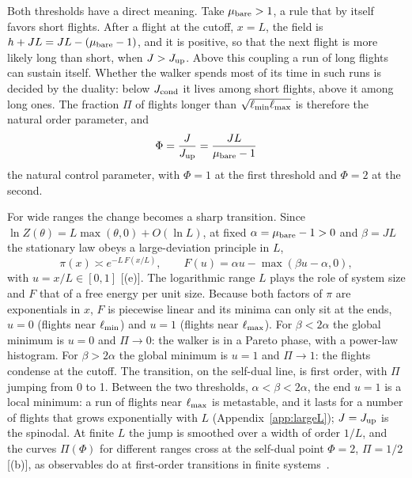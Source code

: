 Both thresholds have a direct meaning. Take $\mu_{\rm bare}>1$, a rule that by itself favors short flights. After a flight at the cutoff, $x=L$, the field is $h+JL=JL-(\mu_{\rm bare}-1)$, and it is positive, so that the next flight is more likely long than short, when $J>J_{\rm up}$. Above this coupling a run of long flights can sustain itself. Whether the walker spends most of its time in such runs is decided by the duality: below $J_{\rm cond}$ it lives among short flights, above it among long ones. The fraction $\Pi$ of flights longer than $\sqrt{\ell_{\min}\ell_{\max}}$ is therefore the natural order parameter, and
\begin{equation}
\Phi=\frac J{J_{\rm up}}=\frac{JL}{\mu_{\rm bare}-1}
\end{equation}
the natural control parameter, with $\Phi=1$ at the first threshold and $\Phi=2$ at the second.

For wide ranges the change becomes a sharp transition. Since $\ln Z(\theta)=L\max(\theta,0)+O(\ln L)$, at fixed $\alpha=\mu_{\rm bare}-1>0$ and $\beta=JL$ the stationary law obeys a large-deviation principle in $L$,
\begin{equation}
\pi(x)\asymp e^{-L\,F(x/L)},\qquad F(u)=\alpha u-\max(\beta u-\alpha,0),
\label{eq:freeenergy}
\end{equation}
with $u=x/L\in[0,1]$ [(e)]. The logarithmic range $L$ plays the role of system size and $F$ that of a free energy per unit size. Because both factors of $\pi$ are exponentials in $x$, $F$ is piecewise linear and its minima can only sit at the ends, $u=0$ (flights near $\ell_{\min}$) and $u=1$ (flights near $\ell_{\max}$). For $\beta<2\alpha$ the global minimum is $u=0$ and $\Pi\to0$: the walker is in a Pareto phase, with a power-law histogram. For $\beta>2\alpha$ the global minimum is $u=1$ and $\Pi\to1$: the flights condense at the cutoff. The transition, on the self-dual line, is first order, with $\Pi$ jumping from 0 to 1. Between the two thresholds, $\alpha<\beta<2\alpha$, the end $u=1$ is a local minimum: a run of flights near $\ell_{\max}$ is metastable, and it lasts for a number of flights that grows exponentially with $L$ (Appendix~\ref{app:largeL}); $J=J_{\rm up}$ is the spinodal. At finite $L$ the jump is smoothed over a width of order $1/L$, and the curves $\Pi(\Phi)$ for different ranges cross at the self-dual point $\Phi=2$, $\Pi=1/2$ [(b)], as observables do at first-order transitions in finite systems~\cite{BinderLandau1984}.

